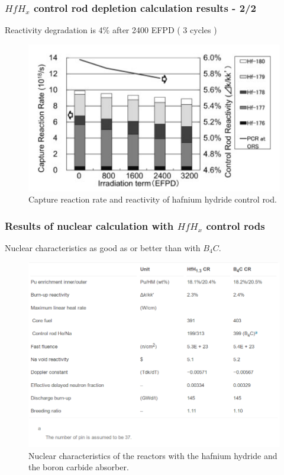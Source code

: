 \documentclass[9pt]{beamer}
\newcommand{\hfh}{$HfH_{x}$\xspace}
\newcommand{\bc}{$B_4C$\xspace}
\begin{document}
\begin{frame}
\frametitle{\hfh control rod depletion calculation results - 2/2}
Reactivity degradation is 4\% after 2400 \gls{EFPD} ( 3 cycles )
\begin{figure}[htbp!]
  \begin{center}
      \includegraphics[scale=0.5]{./images/irrad_reac.png}
  \end{center}
  \caption{Capture reaction rate and reactivity of hafnium hydride control rod.}
  \label{fig:irrad_reac}
\end{figure}
\end{frame}

\begin{frame}
\frametitle{Results of nuclear calculation with \hfh control rods}
Nuclear characteristics as good as or better than with \bc.
\begin{figure}[htbp!]
  \begin{center}
      \includegraphics[scale=0.25]{./images/reac.png}
  \end{center}
  \caption{Nuclear characteristics of the reactors with the hafnium hydride and the boron carbide absorber.}
  \label{fig:reac}
\end{figure}
\end{frame}
\end{document}
